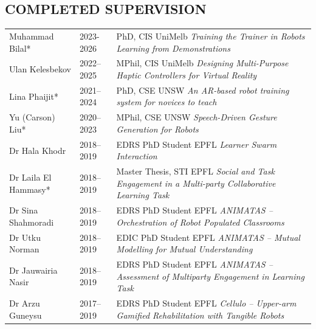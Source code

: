 
\subsection{COMPLETED SUPERVISION}
\vspace{2pt}

\noindent
\begin{tabularx}{\textwidth}{@{}llX@{}}
Muhammad Bilal*         & 2023-2026      & PhD, CIS UniMelb \quad \textit{Training the Trainer in Robots Learning from Demonstrations} \\[2pt]
Ulan Kelesbekov         & 2022--2025      & MPhil, CIS UniMelb \quad \textit{Designing Multi-Purpose Haptic Controllers for Virtual Reality} \\[2pt]
Lina Phaijit*            & 2021--2024      & PhD, CSE UNSW \quad \textit{An AR-based robot training system for novices to teach} \\[2pt]
Yu (Carson) Liu*        & 2020--2023      & MPhil, CSE UNSW \quad \textit{Speech-Driven Gesture Generation for Robots} \\[2pt]
Dr Hala Khodr           & 2018--2019      & EDRS PhD Student EPFL \quad \textit{Learner Swarm Interaction} \\[2pt]
Dr Laila El Hammasy*    & 2018--2019      & Master Thesis, STI EPFL \quad \textit{Social and Task Engagement in a Multi-party Collaborative Learning Task} \\[2pt]
Dr Sina Shahmoradi      & 2018--2019      & EDRS PhD Student EPFL \quad \textit{ANIMATAS -- Orchestration of Robot Populated Classrooms} \\[2pt]
Dr Utku Norman          & 2018--2019      & EDIC PhD Student EPFL \quad \textit{ANIMATAS -- Mutual Modelling for Mutual Understanding} \\[2pt]
Dr Jauwairia Nasir      & 2018--2019      & EDRS PhD Student EPFL \quad \textit{ANIMATAS -- Assessment of Multiparty Engagement in Learning Task} \\[2pt]
Dr Arzu Guneysu         & 2017--2019      & EDRS PhD Student EPFL \quad \textit{Cellulo -- Upper-arm Gamified Rehabilitation with Tangible Robots} \\[2pt]

\end{tabularx}
